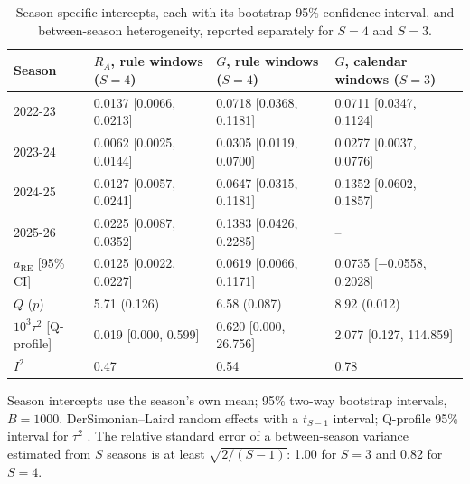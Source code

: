 \begin{table}[htbp]
\centering
\footnotesize
\caption{Season-specific intercepts, each with its bootstrap 95\% confidence interval, and between-season heterogeneity, reported separately for $S=4$ and $S=3$.}
\label{tab:s5}
\begin{tabular}{llll}
\toprule
Season & $R_A$, rule windows ($S=4$) & $G$, rule windows ($S=4$) & $G$, calendar windows ($S=3$) \\
\midrule
2022-23 & 0.0137 [0.0066, 0.0213] & 0.0718 [0.0368, 0.1181] & 0.0711 [0.0347, 0.1124] \\
2023-24 & 0.0062 [0.0025, 0.0144] & 0.0305 [0.0119, 0.0700] & 0.0277 [0.0037, 0.0776] \\
2024-25 & 0.0127 [0.0057, 0.0241] & 0.0647 [0.0315, 0.1181] & 0.1352 [0.0602, 0.1857] \\
2025-26 & 0.0225 [0.0087, 0.0352] & 0.1383 [0.0426, 0.2285] & -- \\
$a_{\mathrm{RE}}$ [95\% CI] & 0.0125 [0.0022, 0.0227] & 0.0619 [0.0066, 0.1171] & 0.0735 [$-$0.0558, 0.2028] \\
$Q$ ($p$) & 5.71 (0.126) & 6.58 (0.087) & 8.92 (0.012) \\
$10^3\tau^2$ [Q-profile] & 0.019 [0.000, 0.599] & 0.620 [0.000, 26.756] & 2.077 [0.127, 114.859] \\
$I^2$ & 0.47 & 0.54 & 0.78 \\
\bottomrule
\end{tabular}
\par\smallskip
\begin{minipage}{0.95\linewidth}\scriptsize Season intercepts use the season's own mean; 95\% two-way bootstrap intervals, $B=1000$. DerSimonian--Laird random effects with a $t_{S-1}$ interval; Q-profile 95\% interval for $\tau^2$ \citep{viechtbauer2007confidence}. The relative standard error of a between-season variance estimated from $S$ seasons is at least $\sqrt{2/(S-1)}$: 1.00 for $S=3$ and 0.82 for $S=4$.\end{minipage}
\end{table}
